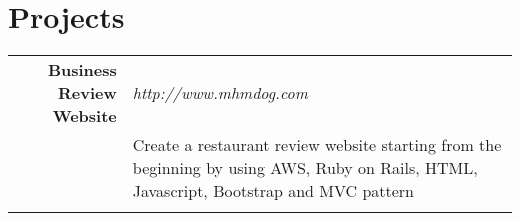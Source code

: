 \documentclass[a4paper,11pt]{article}
\begin{document}
\section{Projects}
\begin{tabular}{r|p{11cm}}
 \textbf{Business Review Website} &  \emph{http://www.mhmdog.com}\\ 
 & Create a restaurant review website starting from the beginning by using AWS, Ruby on Rails, HTML, Javascript, Bootstrap and MVC pattern \\
 &  \fontsize{10}{12}\selectfont{ - https://github.com/breadbrad/gourmet }
\end{tabular}
\end{document}
